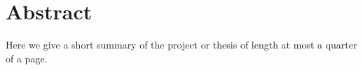 \cleardoublepage

\section*{Abstract}
Here we give a short summary of the project or thesis of length at most a quarter of a page.



